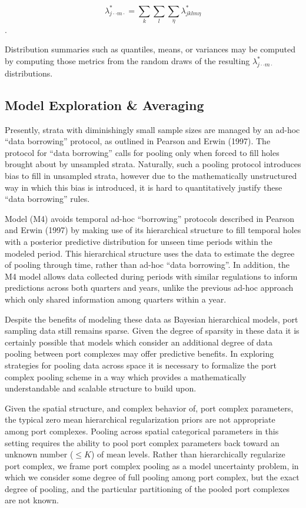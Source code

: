 \documentclass[12pt]{article}
\begin{document}
\[\lambda^*_{j\cdot\cdot m\cdot} =\sum_{k}\sum_{l}\sum_{\eta}\lambda^*_{jklm\eta}\].

Distribution summaries such as quantiles, means, or variances may be
computed by computing those metrics from the random draws of the
resulting \(\lambda^*_{j\cdot\cdot m\cdot}\) distributions.

\subsection{Model Exploration \& Averaging}\label{model-exploration-averaging}

Presently, strata with diminishingly small sample sizes are managed by
an ad-hoc ``data borrowing'' protocol, as outlined in Pearson and Erwin
(1997). The protocol for ``data borrowing'' calls for pooling only when
forced to fill holes brought about by unsampled strata. Naturally, such
a pooling protocol introduces bias to fill in unsampled strata, however
due to the mathematically unstructured way in which this bias is
introduced, it is hard to quantitatively justify these ``data
borrowing'' rules.

Model (M4) avoids temporal ad-hoc ``borrowing'' protocols described in
Pearson and Erwin (1997) by making use of its hierarchical structure to
fill temporal holes with a posterior predictive distribution for unseen
time periods within the modeled period. This hierarchical structure uses
the data to estimate the degree of pooling through time, rather than
ad-hoc ``data borrowing''. In addition, the M4 model allows data collected 
during periods with similar regulations to inform predictions across both 
quarters and years, unlike the previous ad-hoc approach which only shared 
information among quarters within a year.

Despite the benefits of modeling these data as Bayesian hierarchical
models, port sampling data still remains sparse. Given the degree of
sparsity in these data it is certainly possible that models which
consider an additional degree of data pooling between port complexes may
offer predictive benefits. In exploring strategies for pooling data
across space it is necessary to formalize the port complex pooling
scheme in a way which provides a mathematically understandable and
scalable structure to build upon.

Given the spatial structure, and complex behavior of, port complex
parameters, the typical zero mean hierarchical regularization priors are
not appropriate among port complexes. Pooling across spatial categorical
parameters in this setting requires the ability to pool port complex
parameters back toward an unknown number (\(\le K\)) of mean levels.
Rather than hierarchically regularize port complex, we frame port
complex pooling as a model uncertainty problem, in which we consider
some degree of full pooling among port complex, but the exact degree of
pooling, and the particular partitioning of the pooled port complexes
are not known.
\end{document}
